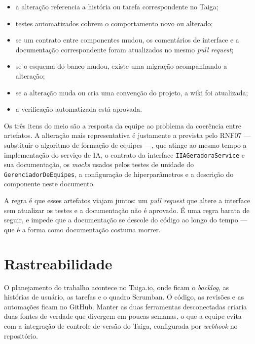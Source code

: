 \documentclass[a4paper,12pt,oneside,openany]{book}
\newif\iforientacoes
\newcommand{\orientacao}[1]{%
    \iforientacoes
        \begin{quote}
        \small\itshape\textbf{Orientação:} #1
        \end{quote}
    \fi
}
\begin{document}
\begin{itemize}[nosep]
    \item a alteração referencia a história ou tarefa correspondente no Taiga;
    \item testes automatizados cobrem o comportamento novo ou alterado;
    \item se um contrato entre componentes mudou, os comentários de interface e
    a documentação correspondente foram atualizados no mesmo \textit{pull
    request};
    \item se o esquema do banco mudou, existe uma migração acompanhando a
    alteração;
    \item se a alteração muda ou cria uma convenção do projeto, a wiki foi
    atualizada;
    \item a verificação automatizada está aprovada.
\end{itemize}

Os três itens do meio são a resposta da equipe ao problema da coerência entre
artefatos. A alteração mais representativa é justamente a prevista pelo RNF07
--- substituir o algoritmo de formação de equipes ---, que atinge ao mesmo
tempo a implementação do serviço de IA, o contrato da interface
\texttt{IIAGeradoraService} e sua documentação, os \textit{mocks} usados pelos
testes de unidade do \texttt{GerenciadorDeEquipes}, a configuração de
hiperparâmetros e a descrição do componente neste documento.

A regra é que esses artefatos viajam juntos: um \textit{pull request} que
altere a interface sem atualizar os testes e a documentação não é aprovado. É
uma regra barata de seguir, e impede que a documentação se descole do código ao
longo do tempo --- que é a forma como documentação costuma morrer.

\section{Rastreabilidade}\label{sec:rastreabilidade}

\orientacao{Quando aplicável, mostrem como uma alteração pode ser rastreada
entre os artefatos relacionados, por exemplo: necessidade/requisito, tarefa
ou \textit{issue}, componente afetado, \textit{commit} e caso de teste.
Não é necessário criar uma matriz extensa; um ou dois exemplos relevantes
podem ser suficientes para demonstrar a prática.}

O planejamento do trabalho acontece no Taiga.io, onde ficam o \textit{backlog},
as histórias de usuário, as tarefas e o quadro Scrumban. O código, as revisões e
as automações ficam no GitHub. Manter as duas ferramentas desconectadas criaria
duas fontes de verdade que divergem em poucas semanas, o que a equipe evita com
a integração de controle de versão do Taiga, configurada por \textit{webhook}
no repositório.
\end{document}
